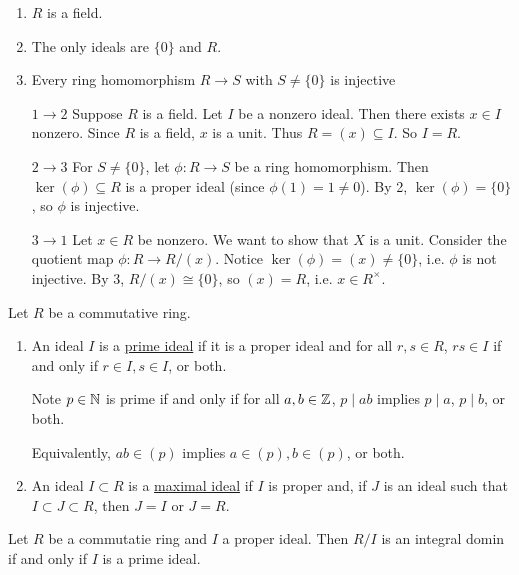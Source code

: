\documentclass[x11names,reqno,14pt]{extarticle}
\begin{document}
\begin{enumerate}
\item $R$ is a field. 
\item The only ideals are $\{0\}$ and $R$.
\item Every ring homomorphism $R\to S$ with $S \neq\{0\}$ is injective
\end{enumerate}

\proof

\begin{itemize}
\item[$1\to2$] Suppose $R$ is a field. Let $I$ be a nonzero ideal. Then there exists $x \in I$ nonzero. Since $R$ is a field, $x$ is a unit. Thus $R = (x) \subseteq I$. So $I = R$. 

\item[$2\to3$]For $S \neq\{0\}$, let $\phi:R\to S$ be a ring homomorphism. Then $\ker(\phi)\subseteq R$ is a proper ideal (since $\phi(1)=1\neq0$). By 2, $\ker(\phi) = \{0\}$, so $\phi$ is injective. 

\item[$3\to1$] Let $x \in R$ be nonzero. We want to show that $X$ is a unit. Consider the quotient map $\phi:R\to R/(x)$. Notice $\ker(\phi) = (x) \neq\{0\}$, i.e. $\phi$ is not injective. By 3, $R/(x) \cong \{0\}$, so $(x) = R$, i.e. $x \in R^\times$. 
\end{itemize}


Let $R$ be a commutative ring. 

\begin{enumerate}
\item An ideal $I$ is a \underline{prime ideal} if it is a proper ideal and for all $r, s \in R$, $rs \in I$ if and only if $r \in I, s \in I$, or both.

Note $p \in \mathbb{N}$ is prime if and only if for all $a, b \in \mathbb{Z}$, $p\mid ab$ implies $p \mid a$, $p \mid b$, or both. 

Equivalently, $ab \in (p)$ implies $a \in (p), b\in(p)$, or both.  

\item An ideal $I\subset R$ is a \underline{maximal ideal} if $I$ is proper and, if $J$ is an ideal such that $I \subset J \subset R$, then $J = I$ or $J = R$. 
\end{enumerate}

\prop Let $R$ be a commutatie ring and $I$ a proper ideal. Then $R/I$ is an integral domin if and only if $I$ is a prime ideal. 

\proof
\end{document}
